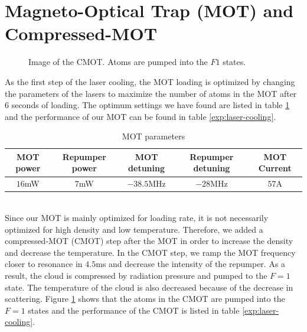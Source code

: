 \section{Magneto-Optical Trap (MOT) and Compressed-MOT}\label{exp:mot}
\begin{figure}
  \begin{center}
  \end{center}
  \caption{Image of the CMOT. Atoms are pumped into the $F1$ states.}
  \label{exp:cmot-image}
\end{figure}
As the first step of the laser cooling, the MOT loading is optimized by changing the parameters of the lasers to maximize the number of atoms in the MOT after $6$ seconds of loading. The optimum settings we have found are listed in table \ref{exp:mot-param} and the performance of our MOT can be found in table \ref{exp:laser-cooling}.\\
\begin{table}
  \begin{center}
    \begin{tabular}{|c|c|c|c|c|}\hline
      MOT power&Repumper power&MOT detuning&Repumper detuning&MOT Current\\\hline
      $16$mW&$7$mW&$-38.5$MHz&$-28$MHz&$57$A\\\hline
    \end{tabular}
  \end{center}
  \caption{MOT parameters}
  \label{exp:mot-param}
\end{table}\\
Since our MOT is mainly optimized for loading rate, it is not necessarily optimized for high density and low temperature. Therefore, we added a compressed-MOT (CMOT) step after the MOT in order to increase the density and decrease the temperature. In the CMOT step, we ramp the MOT frequency closer to resonance in $4.5$ms and decrease the intensity of the repumper. As a result, the cloud is compressed by radiation pressure and pumped to the $F=1$ state. The temperature of the cloud is also decreased because of the decrease in scattering. Figure \ref{exp:cmot-image} shows that the atoms in the CMOT are pumped into the $F=1$ states and the performance of the CMOT is listed in table \ref{exp:laser-cooling}.

